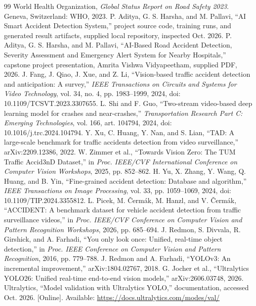 \documentclass[12pt,a4paper]{article}
\begin{document}
\begin{thebibliography}{99}\small
{} World Health Organization, \emph{Global Status Report on Road Safety 2023}. Geneva, Switzerland: WHO, 2023.
 P. Aditya, G. S. Harsha, and M. Pallavi, ``AI Smart Accident Detection System,'' project source code, training runs, and generated result artifacts, supplied local repository, inspected Oct. 2026.
 P. Aditya, G. S. Harsha, and M. Pallavi, ``AI-Based Road Accident Detection, Severity Assessment and Emergency Alert System for Nearby Hospitals,'' capstone project presentation, Amrita Vishwa Vidyapeetham, supplied PDF, 2026.
 J. Fang, J. Qiao, J. Xue, and Z. Li, ``Vision-based traffic accident detection and anticipation: A survey,'' \emph{IEEE Transactions on Circuits and Systems for Video Technology}, vol. 34, no. 4, pp. 1983--1999, 2024, doi: 10.1109/TCSVT.2023.3307655.
 L. Shi and F. Guo, ``Two-stream video-based deep learning model for crashes and near-crashes,'' \emph{Transportation Research Part C: Emerging Technologies}, vol. 166, art. 104794, 2024, doi: 10.1016/j.trc.2024.104794.
 Y. Xu, C. Huang, Y. Nan, and S. Lian, ``TAD: A large-scale benchmark for traffic accidents detection from video surveillance,'' arXiv:2209.12386, 2022.
 W. Zimmer et al., ``Towards Vision Zero: The TUM Traffic Accid3nD Dataset,'' in \emph{Proc. IEEE/CVF International Conference on Computer Vision Workshops}, 2025, pp. 852--862.
 H. Yu, X. Zhang, Y. Wang, Q. Huang, and B. Yin, ``Fine-grained accident detection: Database and algorithm,'' \emph{IEEE Transactions on Image Processing}, vol. 33, pp. 1059--1069, 2024, doi: 10.1109/TIP.2024.3355812.
 L. Picek, M. \v{C}erm\'ak, M. Hanzl, and V. \v{C}erm\'ak, ``ACCIDENT: A benchmark dataset for vehicle accident detection from traffic surveillance videos,'' in \emph{Proc. IEEE/CVF Conference on Computer Vision and Pattern Recognition Workshops}, 2026, pp. 685--694.
 J. Redmon, S. Divvala, R. Girshick, and A. Farhadi, ``You only look once: Unified, real-time object detection,'' in \emph{Proc. IEEE Conference on Computer Vision and Pattern Recognition}, 2016, pp. 779--788.
 J. Redmon and A. Farhadi, ``YOLOv3: An incremental improvement,'' arXiv:1804.02767, 2018.
 G. Jocher et al., ``Ultralytics YOLO26: Unified real-time end-to-end vision models,'' arXiv:2606.03748, 2026.
 Ultralytics, ``Model validation with Ultralytics YOLO,'' documentation, accessed Oct. 2026. [Online]. Available: \url{https://docs.ultralytics.com/modes/val/}

\end{thebibliography}
\end{document}
